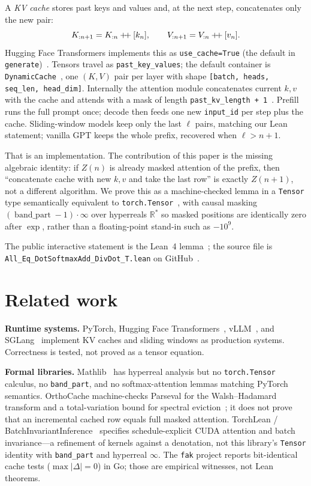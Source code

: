 \documentclass[11pt,a4paper]{article}
\newcommand{\bandpart}{\operatorname{band\_part}}
\newcommand{\concat}{\mathbin{+\mkern-4mu+}}
\newcommand{\Rstar}{\mathbb{R}^*}
\begin{document}
A \emph{KV cache} stores past keys and values and, at the next step, concatenates only the new pair:
\[
K_{:n+1}=K_{:n}\concat[k_n],\qquad V_{:n+1}=V_{:n}\concat[v_n].
\]
Hugging Face Transformers implements this as \texttt{use\_cache=True} (the default in \texttt{generate})~\cite{huggingface_generate}.
Tensors travel as \texttt{past\_key\_values}; the default container is \texttt{DynamicCache}~\cite{huggingface_dynamic_cache}, one $(K,V)$ pair per layer with shape \texttt{[batch, heads, seq\_len, head\_dim]}.
Internally the attention module concatenates current $k,v$ with the cache and attends with a mask of length \texttt{past\_kv\_length + 1}~\cite{huggingface_kv_cache}.
Prefill runs the full prompt once; decode then feeds one new \texttt{input\_id} per step plus the cache.
Sliding-window models keep only the last $\ell$ pairs, matching our Lean statement; vanilla GPT keeps the whole prefix, recovered when $\ell>n+1$.

That is an implementation.
The contribution of this paper is the missing algebraic identity: if $Z(n)$ is already masked attention of the prefix, then ``concatenate cache with new $k,v$ and take the last row'' is exactly $Z(n{+}1)$, not a different algorithm.
We prove this as a machine-checked lemma in a \texttt{Tensor} type semantically equivalent to \texttt{torch.Tensor}~\cite{lemma_repo}, with causal masking $(\bandpart-1)\cdot\infty$ over hyperreals $\Rstar$ so masked positions are identically zero after $\exp$, rather than a floating-point stand-in such as $-10^9$.

The public interactive statement is the Lean~4 lemma~\cite{lemma_kv_cache_lean}; the source file is
\texttt{All\_Eq\_DotSoftmaxAdd\_DivDot\_T.lean} on GitHub~\cite{lemma_repo}.

\section{Related work}
\label{sec:related}

\textbf{Runtime systems.}
PyTorch, Hugging Face Transformers~\cite{huggingface_kv_cache}, vLLM~\cite{vllm}, and SGLang~\cite{sglang} implement KV caches and sliding windows as production systems.
Correctness is tested, not proved as a tensor equation.

\textbf{Formal libraries.}
Mathlib~\cite{mathlib_hyperreal} has hyperreal analysis but no \texttt{torch.Tensor} calculus, no \texttt{band\_part}, and no softmax-attention lemmas matching PyTorch semantics.
OrthoCache machine-checks Parseval for the Walsh--Hadamard transform and a total-variation bound for spectral eviction~\cite{orthocache}; it does not prove that an incremental cached row equals full masked attention.
TorchLean / BatchInvariantInference~\cite{torchlean} specifies schedule-explicit CUDA attention and batch invariance---a refinement of kernels against a denotation, not this library's \texttt{Tensor} identity with \texttt{band\_part} and hyperreal $\infty$.
The \texttt{fak} project reports bit-identical cache tests ($\max|\Delta|=0$) in Go; those are empirical witnesses, not Lean theorems.
\end{document}
